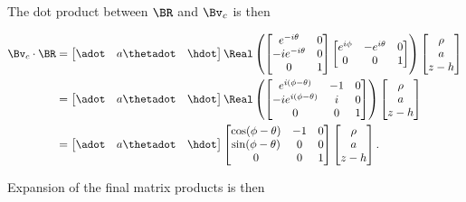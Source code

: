 {The dot product between $\BR$ and $\Bv_c$ is then

\begin{equation}\label{eqn:relativisticElectrodynamicsExamReflection:1250}
\begin{aligned}
\Bv_c \cdot \BR 
&=
\begin{bmatrix}
\adot &
a \thetadot &
\hdot
\end{bmatrix}
\Real \left( 
\begin{bmatrix}
e^{-i\theta}  & 0 \\
-i e^{-i\theta}  & 0 \\
0 & 1
\end{bmatrix} 
\begin{bmatrix}
e^{i\phi} & -e^{i\theta} & 0 \\
0 & 0 & 1
\end{bmatrix}
\right)
\begin{bmatrix}
\rho \\
a \\
z - h
\end{bmatrix} \\
&=
\begin{bmatrix}
\adot &
a \thetadot &
\hdot
\end{bmatrix}
\Real \left( 
\begin{bmatrix}
e^{i(\phi - \theta)} & -1 & 0  \\
-i e^{i(\phi - \theta)} & i & 0 \\
0 & 0 & 1
\end{bmatrix} 
\right)
\begin{bmatrix}
\rho \\
a \\
z - h
\end{bmatrix} \\
&=
\begin{bmatrix}
\adot &
a \thetadot &
\hdot
\end{bmatrix}
\begin{bmatrix}
\cos(\phi - \theta) & -1 & 0  \\
\sin(\phi - \theta) & 0 & 0 \\
0 & 0 & 1
\end{bmatrix} 
\begin{bmatrix}
\rho \\
a \\
z - h
\end{bmatrix}.
\end{aligned}
\end{equation}

Expansion of the final matrix products is then

}
